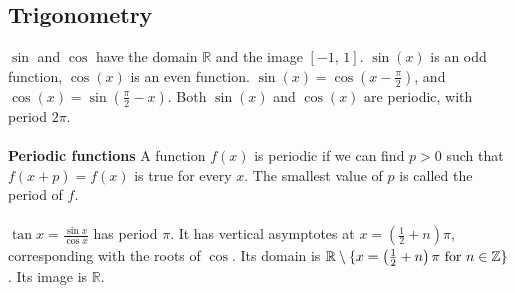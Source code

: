 \documentclass[10pt, a4paper]{article}
\newcommand{\Z}{\mathbb{Z}}
\newcommand{\R}{\mathbb{R}}
\begin{document}
\subsection{Trigonometry}
$\sin$ and $\cos$ have the domain $\R$ and the image $[-1,\,1]$. $\sin{(x)}$ is an odd function, $\cos{(x)}$ is an even function. $\sin{(x)} = \cos{(x - \frac{\pi}{2})}$, and $\cos{(x)} = \sin{(\frac{\pi}{2} - x)}$. Both $\sin{(x)}$ and $\cos{(x)}$ are periodic, with period $2\pi$. \\
\\
\textbf{Periodic functions} A function $f(x)$ is periodic if we can find $p > 0$ such that $f(x + p) = f(x)$ is true for every $x$. The smallest value of $p$ is called the period of $f$. \\
\\
$\tan{x} = \frac{\sin{x}}{\cos{x}}$ has period $\pi$. It has vertical asymptotes at $x = \left(\frac{1}{2} + n\right)\pi$, corresponding with the roots of $\cos$. Its domain is $\R \setminus \{x = \left(\frac{1}{2} + n\right)\pi\textnormal{ for } n \in \Z\}$. Its image is $\R$. \\
\\
\end{document}
